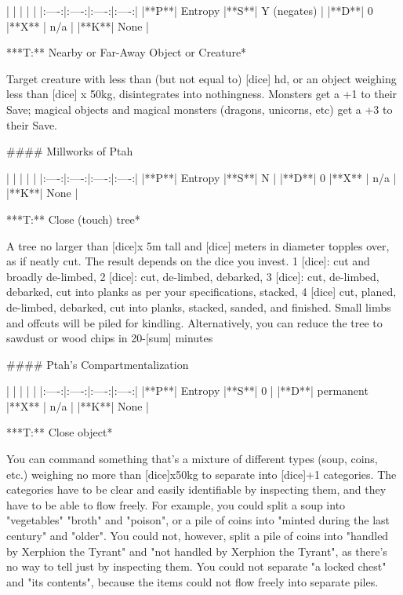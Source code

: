 | | | | |
|:----:|:----:|:----:|:----:|
|**P**| Entropy |**S**|  Y (negates) |
|**D**| 0 |**X** |  n/a  |
|**K**| None |


***T:**   Nearby or Far-Away Object or Creature*



Target creature with less than (but not equal to) [dice] {hd}, or an object weighing less than [dice] x 50kg, disintegrates into nothingness.  Monsters get a +1 to their Save; magical objects and magical monsters (dragons, unicorns, etc) get a +3 to their Save.






#### Millworks of Ptah

| | | | |
|:----:|:----:|:----:|:----:|
|**P**| Entropy |**S**|  N |
|**D**| 0 |**X** |  n/a  |
|**K**| None |


***T:**   Close (touch) tree*



A tree no larger than [dice]x 5m tall and [dice] meters in diameter topples over, as if neatly cut. The result depends on the dice you invest. 1 [dice]: cut and broadly de-limbed, 2 [dice]: cut, de-limbed, debarked, 3 [dice]: cut, de-limbed, debarked, cut into planks as per your specifications, stacked, 4 [dice] cut, planed, de-limbed, debarked, cut into planks, stacked, sanded, and finished. Small limbs and offcuts will be piled for kindling. Alternatively, you can reduce the tree to sawdust or wood chips in 20-[sum] minutes




#### Ptah's Compartmentalization

| | | | |
|:----:|:----:|:----:|:----:|
|**P**| Entropy |**S**|  0 |
|**D**| permanent |**X** |  n/a  |
|**K**| None |


***T:**   Close object*



You can command something that's a mixture of different types (soup, coins, etc.) weighing no more than [dice]x50kg to separate into [dice]+1 categories.  The categories have to be clear and easily identifiable by inspecting them, and they have to be able to flow freely.  For example, you could split a soup into "vegetables" "broth" and "poison", or a pile of coins into "minted during the last century" and "older". You could not, however, split a pile of coins into "handled by Xerphion the Tyrant" and "not handled by Xerphion the Tyrant", as there's no way to tell just by inspecting them. You could not separate "a locked chest" and "its contents", because the items could not flow freely into separate piles.




